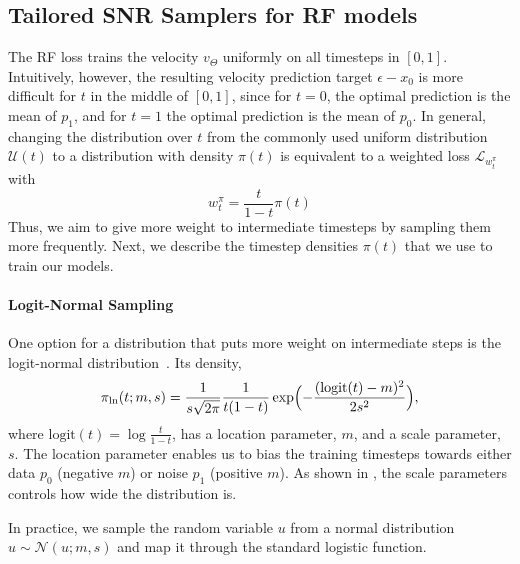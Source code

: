 \subsection{Tailored SNR Samplers for RF models}
\label{subsubsec:tailoredsnrforrf}
The RF loss trains the velocity $v_\Theta$ uniformly on all timesteps in
$[0, 1]$.
Intuitively, however, the resulting velocity prediction target $\epsilon - x_0$ is more
difficult for $t$ in the middle of $[0, 1]$, since for $t=0$, the optimal
prediction is the mean of $p_1$, and for $t=1$ the optimal prediction is the
mean of $p_0$. 
In general, changing the distribution over $t$ from the commonly used
uniform distribution $\mathcal{U}(t)$ to a distribution with density $\pi(t)$
is equivalent to a weighted loss $\mathcal{L}_{w_t^\pi}$ with
\begin{equation}
  w_t^\pi = \frac{t}{1-t}\pi(t)
\end{equation}
Thus, we aim to give more weight to intermediate timesteps by sampling them more frequently. Next, we describe the timestep densities $\pi(t)$ that we use to train our models.

%
%

\paragraph{Logit-Normal Sampling}
One option for a distribution that puts more weight on intermediate steps
is the logit-normal distribution~\cite{atchison1980logistic}. Its density,
\begin{equation}
\pi_{\text{ln}}(t; m, s) = \frac{1}{s\sqrt{2\pi}} \frac{1}{t(1-t)}\exp\Bigl(-\frac{(\text{logit}(t)-m)^2}{2s^2}\Bigr),
\label{eq:logitnormal}
\end{equation}
where $\text{logit}(t) = \log \frac{t}{1-t}$, has a location parameter, $m$,
and a scale parameter, $s$. The location parameter enables us to bias
the training timesteps towards either data $p_0$ (negative $m$) or noise $p_1$
(positive $m$). As shown in , the scale parameters controls how
wide the distribution is.

In practice, we sample the random variable $u$ from a normal distribution $u \sim \mathcal{N}(u; m, s)$ and map it through the standard logistic function.

